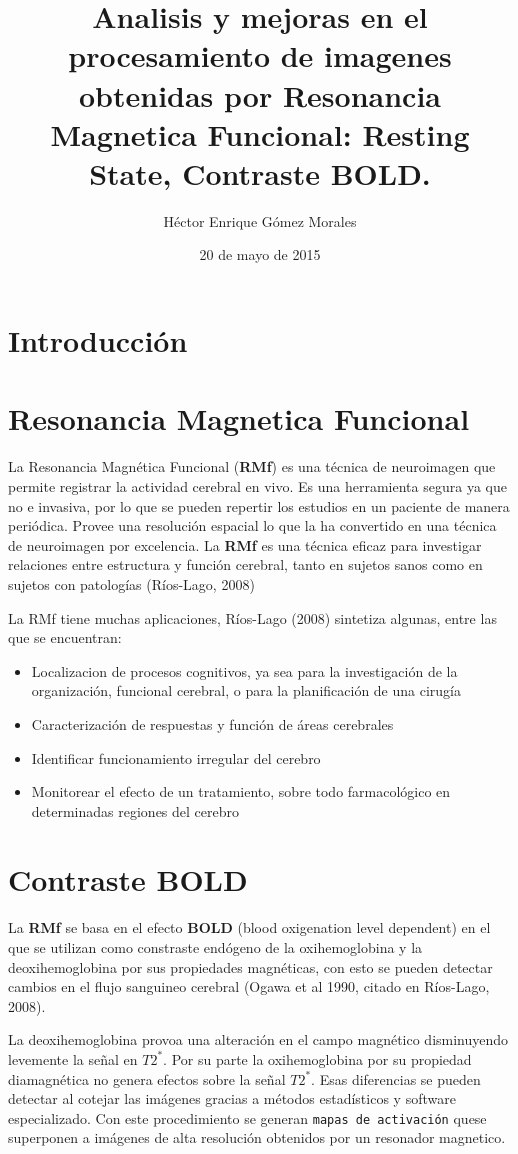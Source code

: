\documentclass{article}
\author{Héctor Enrique Gómez Morales}
\title{
  Analisis y mejoras en el procesamiento de imagenes obtenidas por Resonancia Magnetica Funcional: Resting State, Contraste BOLD. }
\date{20 de mayo de 2015}
\begin{document}
\maketitle
\section{Introducción}

\section{Resonancia Magnetica Funcional}
La Resonancia Magnética Funcional (\textbf{RMf}) es una técnica de neuroimagen que permite registrar la actividad cerebral en vivo. Es una herramienta segura ya que no e invasiva, por lo que se pueden repertir los estudios en un paciente de manera periódica. Provee una resolución espacial lo que la ha convertido en una técnica de neuroimagen por excelencia. La \textbf{RMf} es una técnica eficaz para investigar relaciones entre estructura y función cerebral, tanto en sujetos sanos como en sujetos con patologías (Ríos-Lago, 2008)

La RMf tiene muchas aplicaciones, Ríos-Lago (2008) sintetiza algunas, entre las que se encuentran:

\begin{itemize}
\item Localizacion de procesos cognitivos, ya sea para la investigación de la organización, funcional cerebral, o para la planificación de una cirugía
\item Caracterización de respuestas y función de áreas cerebrales
\item Identificar funcionamiento irregular del cerebro
\item Monitorear el efecto de un tratamiento, sobre todo farmacológico en determinadas regiones del cerebro
\end{itemize}

\section{Contraste BOLD}
La \textbf{RMf} se basa en el efecto \textbf{BOLD} (blood oxigenation level dependent) en el que se utilizan como constraste endógeno de la oxihemoglobina y la deoxihemoglobina por sus propiedades magnéticas, con esto se pueden detectar cambios en el flujo sanguineo cerebral (Ogawa et al 1990, citado en Ríos-Lago, 2008).

La deoxihemoglobina provoa una alteración en el campo magnético disminuyendo levemente la señal en $T2^*$. Por su parte la oxihemoglobina por su propiedad diamagnética no genera efectos sobre la señal $T2^*$. Esas diferencias se pueden detectar al cotejar las imágenes gracias a métodos estadísticos y software especializado. Con este procedimiento se generan \texttt{mapas de activación} quese superponen a imágenes de alta resolución obtenidos por un resonador magnetico.
\end{document}
